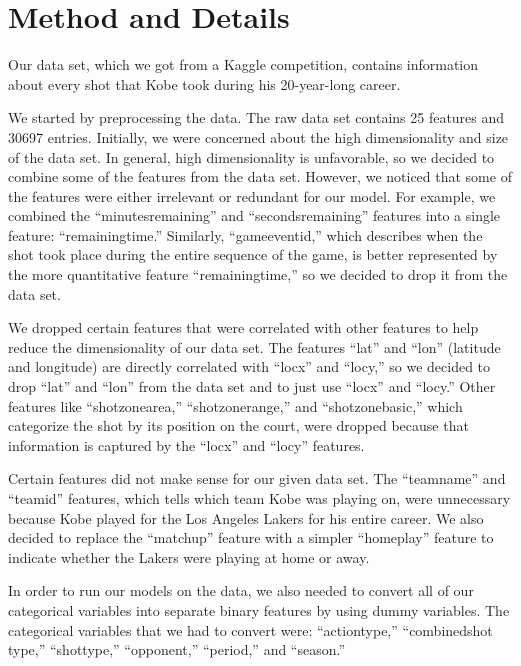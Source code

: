 \documentclass[11pt]{article}
\begin{document}
\section{Method and Details}
Our data set, which we got from a Kaggle competition, contains information about every shot that Kobe took during his 20-year-long career.

We started by preprocessing the data. The raw data set contains 25 features and 30697 entries. Initially, we were concerned about the high dimensionality and size of the data set. In general, high dimensionality is unfavorable, so we decided to combine some of the features from the data set. However, we noticed that some of the features were either irrelevant or redundant for our model. For example, we combined the ``minutes\textunderscore remaining'' and ``seconds\textunderscore remaining'' features into a single feature: ``remaining\textunderscore time.'' Similarly, ``game\textunderscore event\textunderscore id,'' which describes when the shot took place during the entire sequence of the game, is better represented by the more quantitative feature ``remaining\textunderscore time,'' so we decided to drop it from the data set.

We dropped certain features that were correlated with other features to help reduce the dimensionality of our data set. The features ``lat'' and ``lon'' (latitude and longitude) are directly correlated with ``loc\textunderscore x'' and ``loc\textunderscore y,'' so we decided to drop ``lat'' and ``lon'' from the data set and to just use ``loc\textunderscore x'' and ``loc\textunderscore y.'' Other features like ``shot\textunderscore zone\textunderscore area,'' ``shot\textunderscore zone\textunderscore range,'' and ``shot\textunderscore zone\textunderscore basic,'' which categorize the shot by its position on the court, were dropped because that information is captured by the ``loc\textunderscore x'' and ``loc\textunderscore y'' features. 

Certain features did not make sense for our given data set. The ``team\textunderscore name'' and ``team\textunderscore id'' features, which tells which team Kobe was playing on, were unnecessary because Kobe played for the Los Angeles Lakers for his entire career. We also decided to replace the ``matchup'' feature with a simpler ``home\textunderscore play'' feature to indicate whether the Lakers were playing at home or away. 

In order to run our models on the data, we also needed to convert all of our categorical variables into separate binary features by using dummy variables. The categorical variables that we had to convert were: ``action\textunderscore type,'' ``combined\textunderscore shot \textunderscore type,'' ``shot\textunderscore type,'' ``opponent,'' ``period,'' and ``season.''
\end{document}
